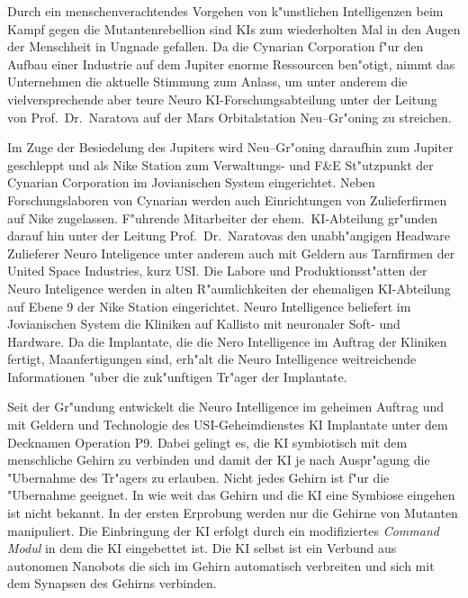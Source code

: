 

Durch ein menschenverachtendes Vorgehen von k"unstlichen Intelligenzen beim Kampf gegen die Mutantenrebellion sind KIs zum wiederholten Mal in den Augen der Menschheit in Ungnade gefallen. Da die Cynarian Corporation f"ur den Aufbau einer Industrie auf dem Jupiter enorme Ressourcen ben"otigt, nimmt das Unternehmen die aktuelle Stimmung zum Anlass, um unter anderem die vielversprechende aber teure Neuro KI-Forschungsabteilung unter der Leitung von Prof.~Dr.~Naratova auf der Mars Orbitalstation Neu--Gr"oning zu streichen.

Im Zuge der Besiedelung des Jupiters wird Neu--Gr"oning daraufhin zum Jupiter geschleppt und als Nike Station zum Verwaltungs- und F\&E St"utzpunkt der Cynarian Corporation im Jovianischen System eingerichtet. Neben Forschungslaboren von Cynarian werden auch Einrichtungen von Zulieferfirmen auf Nike zugelassen. F"uhrende Mitarbeiter der ehem.~KI-Abteilung gr"unden darauf hin unter der Leitung Prof.~Dr.~Naratovas den unabh"angigen Headware Zulieferer Neuro Inteligence unter anderem auch mit Geldern aus Tarnfirmen der United Space Industries, kurz USI. Die Labore und Produktionsst"atten der Neuro Inteligence werden in alten R"aumlichkeiten der ehemaligen KI-Abteilung auf Ebene 9 der Nike Station eingerichtet. Neuro Intelligence beliefert im Jovianischen System die Kliniken auf Kallisto mit neuronaler Soft- und Hardware. Da die Implantate, die die Nero Intelligence im Auftrag der Kliniken fertigt, Ma\3anfertigungen sind, erh"alt die Neuro Intelligence weitreichende Informationen "uber die zuk"unftigen Tr"ager der Implantate.

Seit der Gr"undung entwickelt die Neuro Intelligence im geheimen Auftrag und mit Geldern und Technologie des USI-Geheimdienstes KI Implantate unter dem Decknamen Operation P9. Dabei gelingt es, die KI symbiotisch mit dem menschliche Gehirn zu verbinden und damit der KI je nach Auspr"agung die "Ubernahme des Tr"agers zu erlauben. Nicht jedes Gehirn ist f"ur die "Ubernahme geeignet. In wie weit das Gehirn und die KI eine Symbiose eingehen ist nicht bekannt. In der ersten Erprobung werden nur die Gehirne von Mutanten manipuliert. Die Einbringung der KI erfolgt durch ein modifiziertes \emph{Command Modul} in dem die KI eingebettet ist. Die KI selbst ist ein Verbund aus autonomen Nanobots die sich im Gehirn automatisch verbreiten und sich mit dem Synapsen des Gehirns verbinden.

